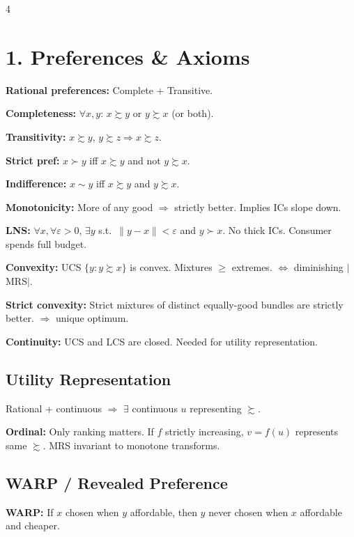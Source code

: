 \documentclass[8pt,landscape]{extarticle}
\newcommand{\HI}[1]{\colorbox{yellow!30}{#1}}
\begin{document}
\begin{multicols}{4}

\section{1. Preferences \& Axioms}

\textbf{Rational preferences:} Complete + Transitive.

\textbf{Completeness:} $\forall x,y$: $x\succsim y$ or $y\succsim x$ (or both).

\textbf{Transitivity:} $x\succsim y$, $y\succsim z \Rightarrow x\succsim z$.

\textbf{Strict pref:} $x\succ y$ iff $x\succsim y$ and not $y\succsim x$.

\textbf{Indifference:} $x\sim y$ iff $x\succsim y$ and $y\succsim x$.

\textbf{Monotonicity:} More of any good $\Rightarrow$ strictly better. Implies ICs slope down.

\textbf{LNS:} $\forall x, \forall\varepsilon>0$, $\exists y$ s.t.\ $\|y-x\|<\varepsilon$ and $y\succ x$. No thick ICs. Consumer spends full budget.

\textbf{Convexity:} UCS $\{y:y\succsim x\}$ is convex. Mixtures $\geq$ extremes. $\Leftrightarrow$ diminishing $|$MRS$|$.

\textbf{Strict convexity:} Strict mixtures of distinct equally-good bundles are strictly better. $\Rightarrow$ unique optimum.

\textbf{Continuity:} UCS and LCS are closed. Needed for utility representation.

\subsection{Utility Representation}
Rational + continuous $\Rightarrow$ $\exists$ continuous $u$ representing $\succsim$.

\textbf{Ordinal:} Only ranking matters. If $f$ strictly increasing, $v=f(u)$ represents same $\succsim$. MRS invariant to monotone transforms.

\subsection{WARP / Revealed Preference}
\HI{\textbf{WARP:}} If $x$ chosen when $y$ affordable, then $y$ never chosen when $x$ affordable and cheaper.


\end{multicols}
\end{document}

